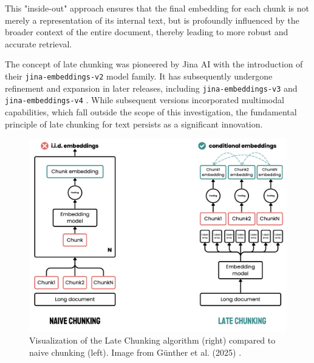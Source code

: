 This "inside-out" approach ensures that the final embedding for each chunk is not merely a representation of its internal text, but is profoundly influenced by the broader context of the entire document, thereby leading to more robust and accurate retrieval.

The concept of late chunking was pioneered by Jina AI with the introduction of their \texttt{jina-embeddings-v2} model family. It has subsequently undergone refinement and expansion in later releases, including \texttt{jina-embeddings-v3} \autocite{sturua2024jinaembeddingsv3multilingualembeddingstask} and \texttt{jina-embeddings-v4} \autocite{günther2025jinaembeddingsv4universalembeddingsmultimodal}. While subsequent versions incorporated multimodal capabilities, which fall outside the scope of this investigation, the fundamental principle of late chunking for text persists as a significant innovation.

\begin{figure}[!htbp]
    \centering
    \includegraphics[width=\textwidth]{images/chapter3/late_chunking.png}
    \caption{Visualization of the Late Chunking algorithm (right) compared to naive chunking (left). Image from Günther et al. (2025) \autocite{günther2025latechunkingcontextualchunk}.}
    \label{fig:late_chunking}
\end{figure}

